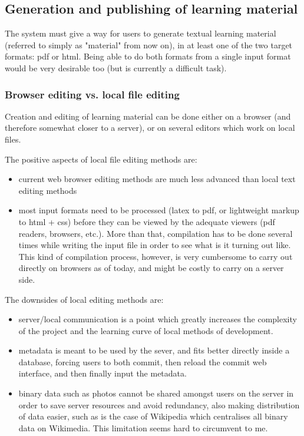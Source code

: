 \documentclass[12pt]{article}
\begin{document}
\subsection{Generation and publishing of learning material}

The system must give a way for users to generate textual learning material (referred to simply as "material" from now on), in at least one of the two target formats: pdf or html. Being able to do both formats from a single input format would be very desirable too (but is currently a difficult task).

\subsubsection{Browser editing vs. local file editing}

Creation and editing of learning material can be done either on a browser (and therefore somewhat closer to a server), or on several editors which work on local files.

  The positive aspects of local file editing methods are:
  \begin{itemize}
    \item current web browser editing methods are much less advanced than local text editing methods
    \item most input formats need to be processed (latex to pdf, or lightweight markup to html + css) before they can be viewed by the adequate viewers (pdf readers, browsers, etc.). More than that, compilation has to be done several times while writing the input file in order to see what is it turning out like. This kind of compilation process, however, is very cumbersome to carry out directly on browsers as of today, and might be costly to carry on a server side.
  \end{itemize}    
  
  The downsides of local editing methods are:
  \begin{itemize}
    \item server/local communication is a point which greatly increases the complexity of the project and the learning curve of local methods of development.
    
    \item metadata is meant to be used by the sever, and fits better directly inside a database, forcing users to both commit, then reload the commit web interface, and then finally input the metadata.
    
    \item binary data such as photos cannot be shared amongst users on the server in order to save server resources and avoid redundancy, also making distribution of data easier, such as is the case of Wikipedia which centralises all binary data on Wikimedia. This limitation seems hard to circumvent to me.
  \end{itemize}
  
\end{document}

